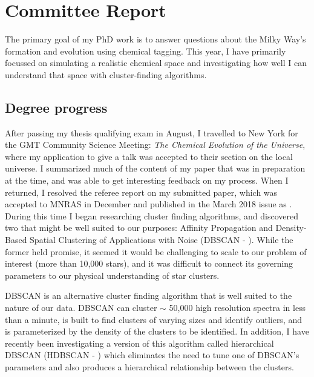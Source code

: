 \documentclass[11pt]{article}
\begin{document}
    
    \section*{Committee Report}
    
    The primary goal of my PhD work is to answer questions about the Milky Way's formation and evolution using chemical tagging. This year, I have primarily focussed on simulating a realistic chemical space and investigating how well I can understand that space with cluster-finding algorithms.    

    \subsection*{Degree progress}
    
    After passing my thesis qualifying exam in August, I travelled to New York for the GMT Community Science Meeting: \emph{The Chemical Evolution of the Universe}, where my application to give a talk was accepted to their section on the local universe. I summarized much of the content of my paper that was in preparation at the time, and was able to get interesting feedback on my process. When I returned, I resolved the referee report on my submitted paper, which was accepted to MNRAS in December and published in the March 2018 issue as \citet{Price-Jones2018}.  During this time I began researching cluster finding algorithms, and discovered two that might be well suited to our purposes: Affinity Propagation \citep{Frey2007} and Density-Based Spatial Clustering of Applications with Noise (DBSCAN - \citealt{Ester1996}). While the former held promise, it seemed it would be challenging to scale to our problem of interest (more than 10,000 stars), and it was difficult to connect its governing parameters to our physical understanding of star clusters. 
    
    DBSCAN is an alternative cluster finding algorithm that is well suited to the nature of our data. DBSCAN can cluster $\sim$ 50,000 high resolution spectra in less than a minute, is built to find clusters of varying sizes and identify outliers, and is parameterized by the density of the clusters to be identified. In addition, I have recently been investigating a version of this algorithm called hierarchical DBSCAN (HDBSCAN - \citealt{Pei2013}) which eliminates the need to tune one of DBSCAN's parameters and also produces a hierarchical relationship between the clusters.
    
\end{document}
